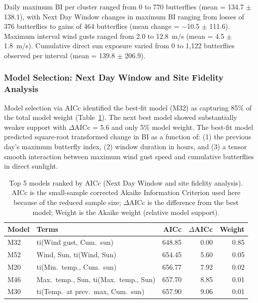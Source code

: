 \documentclass[insects,article,submit,pdftex,moreauthors]{Definitions/mdpi}
\begin{document}
Daily maximum BI per cluster ranged from 0 to 770 butterflies (mean = 134.7 $\pm$ 138.1), with Next Day Window changes in maximum BI ranging from losses of 376 butterflies to gains of 464 butterflies (mean change = $-$10.5 $\pm$ 111.6). Maximum interval wind gusts ranged from 2.0 to 12.8~m/s (mean = 4.5 $\pm$ 1.8~m/s). Cumulative direct sun exposure varied from 0 to 1,122 butterflies observed per interval (mean = 139.8 $\pm$ 206.9).

\subsubsection{Model Selection: Next Day Window and Site Fidelity Analysis}

Model selection via AICc identified the best-fit model (M32) as capturing 85\% of the total model weight (Table~\ref{tab:sunset_model_selection}). The next best model showed substantially weaker support with $\Delta$AICc = 5.6 and only 5\% model weight. The best-fit model predicted square-root transformed change in BI as a function of: (1) the previous day's maximum butterfly index, (2) window duration in hours, and (3) a tensor smooth interaction between maximum wind gust speed and cumulative butterflies in direct sunlight.

\begin{table}[H]
\caption{Top 5 models ranked by AICc (Next Day Window and site fidelity analysis). AICc is the small-sample corrected Akaike Information Criterion used here because of the reduced sample size; $\Delta$AICc is the difference from the best model; Weight is the Akaike weight (relative model support).}
\label{tab:sunset_model_selection}
\centering
\small
\begin{tabular}{llrrr}
\toprule
\textbf{Model} & \textbf{Terms} & \textbf{AICc} & \textbf{$\Delta$AICc} & \textbf{Weight} \\
\midrule
M32 & ti(Wind gust, Cum.\ sun) & 648.85 & 0.00 & 0.85 \\
M52 & Wind, Sun, ti(Wind, Sun) & 654.45 & 5.60 & 0.05 \\
M20 & ti(Min.\ temp., Cum.\ sun) & 656.77 & 7.92 & 0.02 \\
M46 & Max.\ temp., Sun, ti(Max.\ temp., Sun) & 657.70 & 8.85 & 0.01 \\
M30 & ti(Temp.\ at prev.\ max, Cum.\ sun) & 657.90 & 9.06 & 0.01 \\
\bottomrule
\end{tabular}
\end{table}
\end{document}
